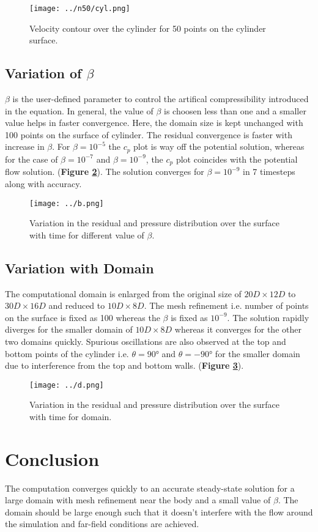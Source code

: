 \documentclass{article}
\begin{document}
\begin{figure}[H]
    \centering
    \texttt{[image: ../n50/cyl.png]}
    \caption{Velocity contour over the cylinder for 50 points on the cylinder surface.}
    \label{fig:cyl_n}
\end{figure}

\subsection{Variation of $\beta$}
$\beta$ is the user-defined parameter to control the artifical compressibility introduced in the equation. In general, the value of $\beta$ is choosen
less than one and a smaller value helps in faster convergence. Here, the domain size is kept unchanged with 100 points on the surface of
cylinder. The residual convergence is faster with increase in $\beta$. For $\beta = 10^{-5}$ the
$c_p$ plot is way off the potential solution, whereas for the case of $\beta = 10^{-7}$ and $\beta = 10^{-9}$, the $c_p$ plot coincides with the potential
flow solution. (\textbf{Figure \ref{fig:b}}). The solution converges for $\beta = 10^{-9}$ in 7 timesteps along with accuracy.

\begin{figure}[H]
    \centering
    \texttt{[image: ../b.png]}
    \caption{Variation in the residual and pressure distribution over the surface with time for different value of $\beta$.}
    \label{fig:b}
\end{figure}

\subsection{Variation with Domain}
The computational domain is enlarged from the original size of $20D\times12D$ to $30D\times16D$ and reduced to $10D\times8D$.
The mesh refinement  i.e. number of points on the surface is fixed as 100 whereas the $\beta$ is fixed as $10^{-9}$.
The solution rapidly diverges for the smaller domain of $10D\times8D$ whereas it converges for the other two domains quickly.
Spurious oscillations are also observed at the top and bottom points of the cylinder i.e. $\theta=90­°$ and $\theta=-90­°$ for
the smaller domain due to interference from the top and bottom walls. (\textbf{Figure \ref{fig:d}}).
\begin{figure}[H]
    \centering
    \texttt{[image: ../d.png]}
    \caption{Variation in the residual and pressure distribution over the surface with time for domain.}
    \label{fig:d}
\end{figure}

\section{Conclusion}
The computation converges quickly to an accurate steady-state solution for a large domain with mesh refinement near the body
and a small value of $\beta$. The domain should be large enough such that it doesn't interfere with the flow around the simulation
and far-field conditions are achieved.
\end{document}
